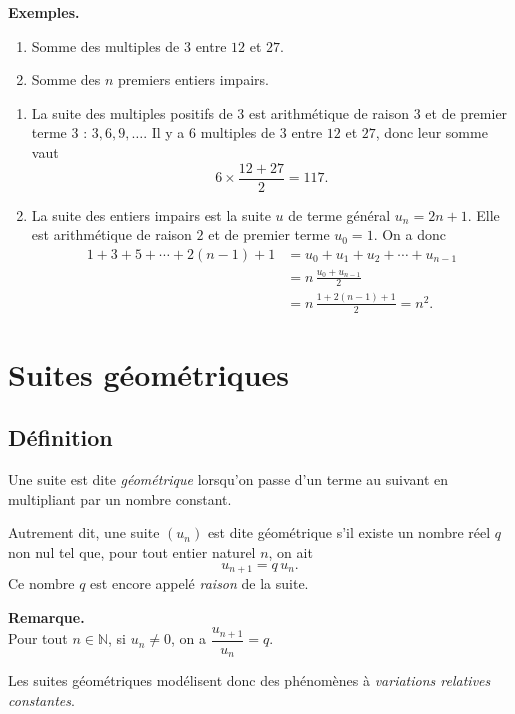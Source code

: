 \documentclass[11pt]{article}
\newcommand{\NN}{\mathbb{N}}
\newenvironment{remarque}{\par\smallskip\noindent\textbf{Remarque. \\}\ignorespaces}{\par\smallskip}
\newenvironment{exemples}{\par\smallskip\noindent\textbf{Exemples. \\}\ignorespaces}{\par\smallskip}
\begin{document}
\begin{exemples}
\begin{enumerate}[label=\arabic*.]
    \item Somme des multiples de $3$ entre $12$ et $27$.
    \item Somme des $n$ premiers entiers impairs.
\end{enumerate}
\begin{enumerate}[label=\arabic*.]
    \item La suite des multiples positifs de $3$ est arithmétique de raison $3$ et de premier terme $3$ : $3,6,9,\ldots$. Il y a $6$ multiples de $3$ entre $12$ et $27$, donc leur somme vaut
    \[
    6\times\frac{12+27}{2}=117.
    \]
    \item La suite des entiers impairs est la suite $u$ de terme général $u_n=2n+1$. Elle est arithmétique de raison $2$ et de premier terme $u_0=1$. On a donc
    \begin{align*}
    1+3+5+\cdots+2(n-1)+1
      &=u_0+u_1+u_2+\cdots+u_{n-1}\\
      &=n\,\frac{u_0+u_{n-1}}{2}\\
      &=n\,\frac{1+2(n-1)+1}{2}=n^2.
    \end{align*}
\end{enumerate}
\end{exemples}

\section{Suites géométriques}

\subsection{Définition}

\begin{definition}
Une suite est dite \emph{géométrique} lorsqu'on passe d'un terme au suivant en multipliant par un nombre constant.

Autrement dit, une suite $(u_n)$ est dite géométrique s'il existe un nombre réel $q$ non nul tel que, pour tout entier naturel $n$, on ait
\[
u_{n+1}=q\,u_n.
\]
Ce nombre $q$ est encore appelé \emph{raison} de la suite.
\end{definition}

\begin{remarque}
Pour tout $n\in\NN$, si $u_n\neq 0$, on a $\dfrac{u_{n+1}}{u_n}=q$.

Les suites géométriques modélisent donc des phénomènes à \emph{variations relatives constantes}.
\end{remarque}
\end{document}
